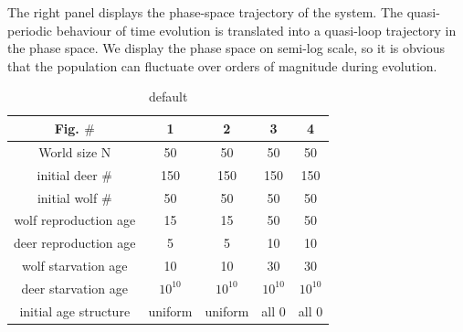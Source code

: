\documentclass[a4paper,12pt]{article}
\begin{document}
The right panel displays the phase-space trajectory of the system. The quasi-periodic behaviour of time evolution is translated into a quasi-loop trajectory in the phase space. We display the phase space on semi-log scale, so it is obvious that the population can fluctuate over orders of magnitude during evolution.

\begin{table}[htdp]
\caption{default}
\begin{center}
\begin{tabular}{c|cccc}
\hline
Fig. $\#$ 			&	1	&	2	&	3	&	4	\\
\hline
World size N		&	50	&	50	&	50	&	50	\\
initial deer $\#$ 	&	150	&	150	&	150	&	150	\\
initial wolf $\#$ 		&	50	&	50	&	50	&	50	\\
wolf reproduction age&	15	&	15	&	50	&	50	\\
deer reproduction age&	5	&	5	&	10	&	10	\\
wolf starvation age 	&	10	&	10	&	30	&	30	\\
deer starvation age	&	$10^{10}$	&	$10^{10}$	&	$10^{10}$	&	$10^{10}$	\\
initial age structure	&	uniform	&	uniform	&	all 0	&	all 0	\\		
\hline
\end{tabular}
\end{center}
\label{Few_parameters}
\end{table}
\end{document}

